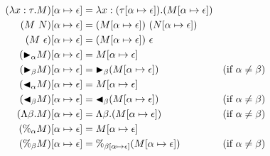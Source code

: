 \begin{align*}
	(\lambda x:\tau.M)[\alpha \mapsto \epsilon] & = \lambda x:(\tau[\alpha \mapsto \epsilon]).(M[\alpha \mapsto \epsilon])                                  \\
	(M\ N)[\alpha \mapsto \epsilon]             & = (M[\alpha \mapsto \epsilon])\ (N[\alpha \mapsto \epsilon])                                          \\
	(M\ \epsilon)[\alpha \mapsto \epsilon]      & = (M[\alpha \mapsto \epsilon])\ \epsilon                                                                \\
	({\mathop{\blacktriangleright}}_\alpha M)[\alpha \mapsto \epsilon]      & = M[\alpha \mapsto \epsilon]                                                                          \\
	({\mathop{\blacktriangleright}}_\beta M)[\alpha \mapsto \epsilon]      & = {\mathop{\blacktriangleright}}_\beta (M[\alpha \mapsto \epsilon])                               & (\text{if } \alpha \neq \beta) \\
	({\mathop{\blacktriangleleft}}_\alpha M)[\alpha \mapsto \epsilon]     & =  M[\alpha \mapsto \epsilon]                                        &                               \\
	({\mathop{\blacktriangleleft}}_\beta M)[\alpha \mapsto \epsilon]     & = {\mathop{\blacktriangleleft}}_\beta (M[\alpha \mapsto \epsilon])                              & (\text{if } \alpha \neq \beta) \\
	(\Lambda\beta.M)[\alpha \mapsto \epsilon]   & = \Lambda\beta.(M[\alpha \mapsto \epsilon])                            & (\text{if } \alpha \neq \beta) \\
	(\%_\alpha M)[\alpha \mapsto \epsilon]       & = M[\alpha \mapsto \epsilon]                                         &                                  \\
	(\%_\beta M)[\alpha \mapsto \epsilon]       & = \%_{\beta[\alpha \mapsto \epsilon]}(M[\alpha \mapsto \epsilon])      & (\text{if } \alpha \neq \beta) \\
\end{align*}

